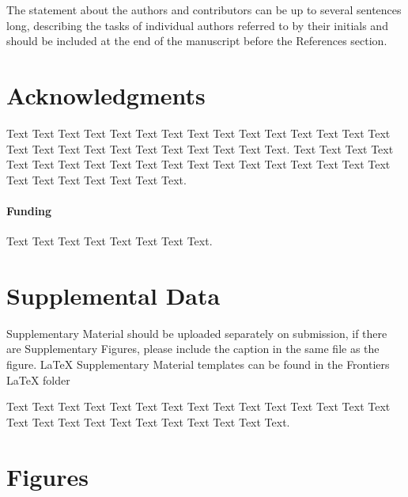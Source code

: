 \documentclass{frontiersSCNS} %
\begin{document}
The statement about the authors and contributors can be up to several sentences long, describing the tasks of individual authors referred to by their initials and should be included at the end of the manuscript before the References section.


\section*{Acknowledgments}
Text Text Text Text Text Text  Text Text Text Text Text Text Text Text  Text Text Text Text Text Text Text Text Text  Text Text Text. Text Text Text Text Text Text  Text Text Text Text Text Text Text Text  Text Text Text Text Text Text Text Text Text  Text Text Text. 


\paragraph{Funding\textcolon} Text Text Text Text Text Text  Text Text.

\section*{Supplemental Data}
Supplementary Material should be uploaded separately on submission, if there are Supplementary Figures, please include the caption in the same file as the figure. LaTeX Supplementary Material templates can be found in the Frontiers LaTeX folder

Text Text Text Text Text Text  Text Text Text Text Text Text Text Text  Text Text Text Text Text Text Text Text Text  Text Text Text.





\section*{Figures}

\end{document}
